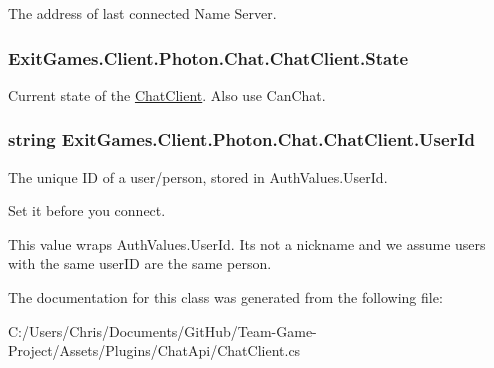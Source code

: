 The address of last connected Name Server.

\subsubsection[{\texorpdfstring{State}{State}}]{ Exit\+Games.\+Client.\+Photon.\+Chat.\+Chat\+Client.\+State\hspace{0.3cm}{\ttfamily [get]}}\hypertarget{class_exit_games_1_1_client_1_1_photon_1_1_chat_1_1_chat_client_a5d523809d52088df6fbd8927523d6238}{}\label{class_exit_games_1_1_client_1_1_photon_1_1_chat_1_1_chat_client_a5d523809d52088df6fbd8927523d6238}


Current state of the \hyperlink{class_exit_games_1_1_client_1_1_photon_1_1_chat_1_1_chat_client}{Chat\+Client}. Also use Can\+Chat.

\subsubsection[{\texorpdfstring{User\+Id}{UserId}}]{\setlength{\rightskip}{0pt plus 5cm}string Exit\+Games.\+Client.\+Photon.\+Chat.\+Chat\+Client.\+User\+Id\hspace{0.3cm}{\ttfamily [get]}}\hypertarget{class_exit_games_1_1_client_1_1_photon_1_1_chat_1_1_chat_client_a8f757bc4e9f4038dc388a8fee3f47150}{}\label{class_exit_games_1_1_client_1_1_photon_1_1_chat_1_1_chat_client_a8f757bc4e9f4038dc388a8fee3f47150}


The unique ID of a user/person, stored in Auth\+Values.\+User\+Id. 

Set it before you connect.

This value wraps Auth\+Values.\+User\+Id. It\textquotesingle{}s not a nickname and we assume users with the same user\+ID are the same person.

The documentation for this class was generated from the following file\+:\begin{DoxyCompactItemize}
\item 
C\+:/\+Users/\+Chris/\+Documents/\+Git\+Hub/\+Team-\/\+Game-\/\+Project/\+Assets/\+Plugins/\+Chat\+Api/Chat\+Client.\+cs\end{DoxyCompactItemize}
